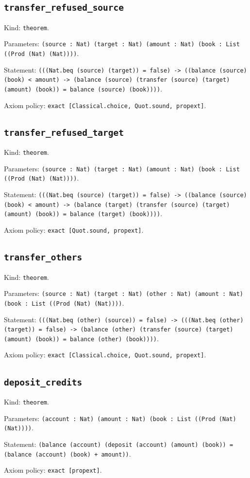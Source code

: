 \documentclass[11pt]{article}
\begin{document}
\subsection*{\texttt{transfer\_refused\_source}}
\noindent Kind: \texttt{theorem}.\par
\noindent Parameters: \texttt{(source : Nat) (target : Nat) (amount : Nat) (book : List ((Prod (Nat) (Nat))))}.\par
\noindent Statement: \texttt{(((Nat.beq (source) (target)) = false) -> ((balance (source) (book) < amount) -> (balance (source) (transfer (source) (target) (amount) (book)) = balance (source) (book))))}.\par
\noindent Axiom policy: \texttt{exact [Classical.choice, Quot.sound, propext]}.\par
\subsection*{\texttt{transfer\_refused\_target}}
\noindent Kind: \texttt{theorem}.\par
\noindent Parameters: \texttt{(source : Nat) (target : Nat) (amount : Nat) (book : List ((Prod (Nat) (Nat))))}.\par
\noindent Statement: \texttt{(((Nat.beq (source) (target)) = false) -> ((balance (source) (book) < amount) -> (balance (target) (transfer (source) (target) (amount) (book)) = balance (target) (book))))}.\par
\noindent Axiom policy: \texttt{exact [Quot.sound, propext]}.\par
\subsection*{\texttt{transfer\_others}}
\noindent Kind: \texttt{theorem}.\par
\noindent Parameters: \texttt{(source : Nat) (target : Nat) (other : Nat) (amount : Nat) (book : List ((Prod (Nat) (Nat))))}.\par
\noindent Statement: \texttt{(((Nat.beq (other) (source)) = false) -> (((Nat.beq (other) (target)) = false) -> (balance (other) (transfer (source) (target) (amount) (book)) = balance (other) (book))))}.\par
\noindent Axiom policy: \texttt{exact [Classical.choice, Quot.sound, propext]}.\par
\subsection*{\texttt{deposit\_credits}}
\noindent Kind: \texttt{theorem}.\par
\noindent Parameters: \texttt{(account : Nat) (amount : Nat) (book : List ((Prod (Nat) (Nat))))}.\par
\noindent Statement: \texttt{(balance (account) (deposit (account) (amount) (book)) = (balance (account) (book) + amount))}.\par
\noindent Axiom policy: \texttt{exact [propext]}.\par
\end{document}
